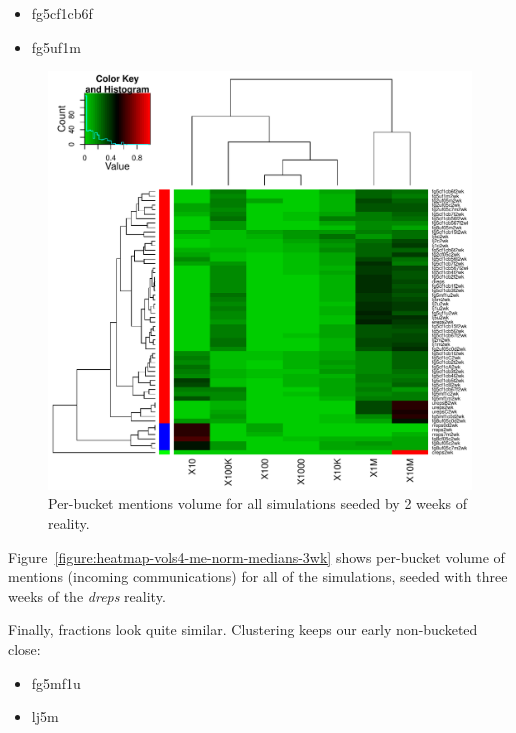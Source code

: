\documentclass[10pt,oneside]{memoir}
\begin{document}
\begin{Spacing}{2}
\begin{itemize}


\item fg5cf1cb6f

\item fg5uf1m
\end{itemize}


\begin{figure}
\begin{center}
    \includegraphics{figures/crop/heatmap-vols4-me-norm-medians-2wk}
    \caption{Per-bucket mentions volume for all simulations seeded by 2 weeks of reality.}
    \label{figure:heatmap-vols4-me-norm-medians-2wk}
\end{center}
\end{figure}
Figure~\ref{figure:heatmap-vols4-me-norm-medians-3wk} shows per-bucket volume of mentions (incoming communications) for all of the simulations, seeded with three weeks of the {\itshape dreps} reality.


Finally, fractions look quite similar.  Clustering keeps our early non-bucketed close:


\begin{itemize}


\item fg5mf1u

\item lj5m
\end{itemize}


\end{Spacing}
\end{document}
